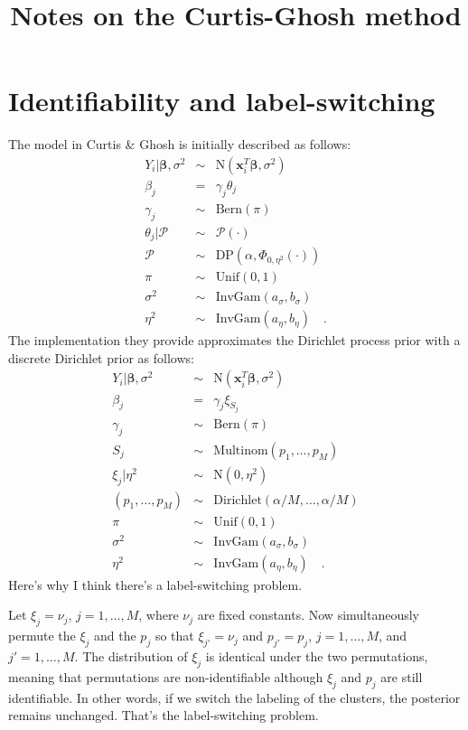 \documentclass[12pt]{article}\usepackage[]{graphicx}\usepackage[]{color}
\begin{document}
\title{Notes on the Curtis-Ghosh method}

\maketitle

\section*{Identifiability and label-switching}

The model in Curtis \& Ghosh is initially described as follows:
\begin{eqnarray*}
Y_i|\bm{\beta},\sigma^2 &\sim& \mbox{N}(\bm{x}_i^T\bm{\beta}, \sigma^2) \\
\beta_j &=& \gamma_j\theta_j \\
\gamma_j &\sim& \mbox{Bern}(\pi) \\
\theta_j|\mathscr{P} &\sim& \mathscr{P}(\cdot) \\
\mathscr{P} &\sim& \mbox{DP}\left(\alpha, \Phi_{0,\eta^2}(\cdot)\right) \\
\pi &\sim& \mbox{Unif}(0, 1) \\
\sigma^2 &\sim& \mbox{InvGam}(a_\sigma, b_\sigma) \\
\eta^2 &\sim& \mbox{InvGam}(a_\eta, b_\eta) \quad .
\end{eqnarray*}
The implementation they provide approximates the Dirichlet process
prior with a discrete Dirichlet prior as follows:
\begin{eqnarray*}
Y_i|\bm{\beta},\sigma^2 &\sim& \mbox{N}(\bm{x}_i^T\bm{\beta}, \sigma^2) \\
\beta_j &=& \gamma_j\xi_{S_j} \\
\gamma_j &\sim& \mbox{Bern}(\pi) \\
S_j &\sim& \mbox{Multinom}(p_1,\dots,p_M) \\
\xi_j|\eta^2 &\sim& \mbox{N}(0, \eta^2) \\
(p_1,\dots,p_M) &\sim& \mbox{Dirichlet}(\alpha/M,\dots,\alpha/M) \\
\pi &\sim& \mbox{Unif}(0, 1) \\
\sigma^2 &\sim& \mbox{InvGam}(a_\sigma, b_\sigma) \\
\eta^2 &\sim& \mbox{InvGam}(a_\eta, b_\eta) \quad .
\end{eqnarray*}
Here's why I think there's a label-switching problem.

Let $\xi_j = \nu_j$, $j=1,\dots,M$, where $\nu_j$ are fixed
constants. Now simultaneously permute the $\xi_j$ and the $p_j$ so
that $\xi_{j'} = \nu_j$ and $p_{j'} = p_j$, $j=1,\dots,M$, and
$j'=1,\dots,M$. The distribution of $\xi_j$ is identical under the two
permutations, meaning that permutations are non-identifiable although
$\xi_j$ and $p_j$ are still identifiable. In other words, if we switch
the labeling of the clusters, the posterior remains unchanged. That's
the label-switching problem.
\end{document}
